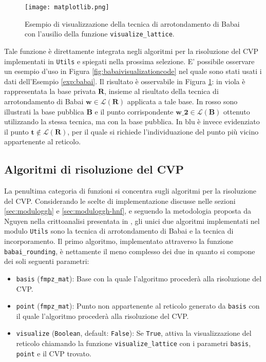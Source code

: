 \begin{figure}[H]
    \centering
    \texttt{[image: matplotlib.png]}
    \caption{Esempio di visualizzazione della tecnica di arrotondamento di Babai con l'ausilio
    della funzione \texttt{visualize\_lattice}.}
    \label{fig:babaivisualizationout}
\end{figure}

Tale funzione è direttamente integrata negli algoritmi per la risoluzione del CVP
implementati in \texttt{Utils} e spiegati nella prossima selezione. 
E' possibile osservare un esempio d'uso in Figura \ref{fig:babaivisualizationcode} nel
quale sono stati usati i dati dell'Esempio \ref{exp:babai}. Il risultato è osservabile 
in Figura \ref{fig:babaivisualizationout}: in viola è rappresentata la base privata $\mathbf{R}$, 
insieme al risultato della tecnica di arrotondamento di Babai 
$\mathbf{w} \in \mathcal{L}(\mathbf{R})$ applicata a tale base.
In rosso sono illustrati la base pubblica $\mathbf{B}$ e il punto corrispondente 
$\mathbf{w\_2} \in \mathcal{L}(\mathbf{B})$ ottenuto utilizzando 
la stessa tecnica, ma con la base pubblica. In blu è invece 
evidenziato il punto $\mathbf{t} \notin \mathcal{L}(\mathbf{R})$, per il quale si richiede 
l'individuazione del punto più vicino appartenente al reticolo.


\subsection{Algoritmi di risoluzione del CVP}

La penultima categoria di funzioni si concentra sugli algoritmi per la risoluzione del 
CVP. Considerando le scelte di implementazione discusse nelle sezioni \ref{sec:moduloggh}
 e \ref{sec:moduloggh-hnf}, e seguendo la metodologia proposta da Nguyen nella crittoanalisi 
presentata in 
\cite{Nguyen99}, gli unici due algoritmi implementati nel modulo \texttt{Utils} 
sono la tecnica di arrotondamento di Babai e la tecnica di incorporamento. Il primo 
algoritmo, implementato attraverso la funzione \texttt{babai\_rounding},
è nettamente il meno complesso dei due in quanto si compone dei soli seguenti parametri:
\begin{itemize}
    \item \texttt{basis} (\texttt{fmpz\_mat}): Base con la quale l'algoritmo procederà 
    alla risoluzione del CVP. 
    \item \texttt{point} (\texttt{fmpz\_mat}): Punto non appartenente al reticolo generato 
    da \texttt{basis} con il quale l'algoritmo procederà alla risoluzione del CVP.
    \item \texttt{visualize} (\texttt{Boolean}, default: \texttt{False}):
    Se \texttt{True}, attiva la visualizzazione del reticolo chiamando la funzione 
    \texttt{visualize\_lattice} con i parametri \texttt{basis}, \texttt{point} e il CVP trovato.
\end{itemize}

